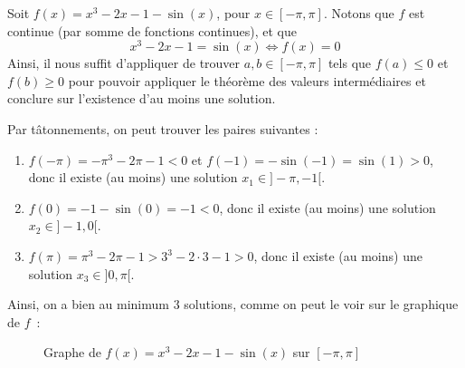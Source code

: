 \begin{exercice}
Soit $f(x) = x^3 - 2x - 1 - \sin(x)$, pour $x \in [-\pi, \pi]$. Notons que $f$ est continue (par somme de fonctions continues), et que
\[
x^3 - 2x - 1 = \sin(x) \iff f(x) = 0
\]
Ainsi, il nous suffit d'appliquer de trouver $a, b \in [-\pi, \pi]$ tels que $f(a) \leq 0$ et $f(b) \geq 0$ pour pouvoir appliquer le théorème des valeurs intermédiaires et conclure sur l'existence d'au moins une solution.

\smallskip
\noindent Par tâtonnements, on peut trouver les paires suivantes :
\begin{enumerate}
    \item $f(-\pi) = -\pi^3 - 2\pi - 1 < 0$ et $f(-1) = - \sin(-1) = \sin(1) > 0$, donc il existe (au moins) une solution $x_1 \in ]-\pi, -1[$.
    \item $f(0) = - 1 - \sin(0) = -1 < 0$, donc il existe (au moins) une solution $x_2 \in ]-1, 0[$.
    \item $f(\pi) = \pi^3 - 2\pi - 1 > 3^3 - 2\cdot 3 - 1 > 0$, donc il existe (au moins) une solution $x_3 \in ]0, \pi[$.
\end{enumerate}
Ainsi, on a bien au minimum 3 solutions, comme on peut le voir sur le graphique de $f$~:
\begin{figure}[H]
    \centering
    \caption{Graphe de $f(x) = x^3 - 2x - 1 - \sin(x)$ sur $[-\pi, \pi]$}
    \label{fig:solutions_graph}
\end{figure}
\end{exercice}